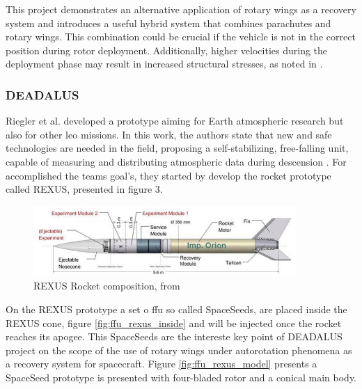 This project demonstrates an alternative application of rotary wings as a recovery system and introduces a useful hybrid system that combines parachutes and rotary wings. This combination could be crucial if the vehicle is not in the correct position during rotor deployment. Additionally, higher velocities during the deployment phase may result in increased structural stresses, as noted in \cite{noauthor_armada_nodate}.

\subsubsection{DEADALUS}

Riegler et al. developed a prototype \cite{riegler_daedalus_2018} aiming for Earth atmospheric research but also for other \gls{leo} missions. In this work, the authors state that new and safe technologies are needed in the field, proposing a self-stabilizing, free-falling unit, capable of measuring and distributing atmospheric data during descension \cite{riegler_daedalus_2018}. For accomplished the teams goal's, they started by develop the rocket prototype called REXUS, presented in figure 3. 


\begin{figure}[!htb]
    \centering
    \includegraphics[width=10cm]{Figures/introduction/REXUS-Rocket-composition_W640.jpg}
    \caption{REXUS Rocket composition, from \cite{riegler_daedalus_2018}}
    \label{fig:rexus_rocket}
\end{figure}

On the REXUS prototype a set o  \gls{ffu} so called SpaceSeeds, are placed inside the REXUS cone, figure \ref{fig:ffu_rexus_inside} and will be injected once the rocket reaches its apogee. This SpaceSeeds are the intereste key point of DEADALUS project on the scope of the use of rotary wings under autorotation phenomena as a recovery system for spacecraft. Figure \ref{fig:ffu_rexus_model} presents a SpaceSeed prototype is presented with four-bladed rotor and a conical main body.




